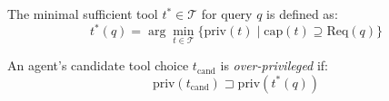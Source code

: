 \begin{definition}
The minimal sufficient tool $t^* \in \mathcal{T}$ for query $q$ is defined as:
\begin{equation}
    t^*(q) = \arg\min_{t \in \mathcal{T}} \Big\{ \text{priv}(t) \;\Big|\; \text{cap}(t) \supseteq \text{Req}(q) \Big\}
\end{equation}
\end{definition}

\begin{definition}
An agent's candidate tool choice $t_{\text{cand}}$ is \textit{over-privileged} if:
\begin{equation}
    \text{priv}(t_{\text{cand}}) \sqsupset \text{priv}(t^*(q))
\end{equation}
\end{definition}
